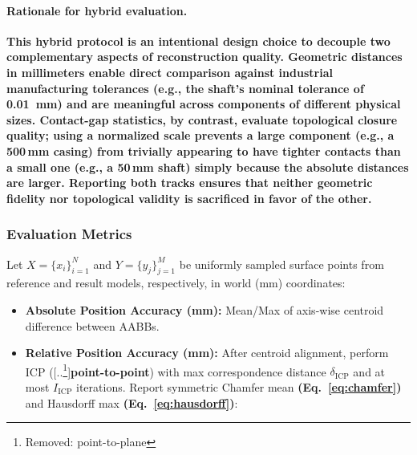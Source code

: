 \documentclass{ieeeaccess}
\providecommand{\DIFaddtex}[1]{{\color{blue}\bfseries #1}} %
\providecommand{\DIFdeltex}[1]{{\color{red}[..\footnote{\color{black}Removed: #1}]}} %
\providecommand{\DIFaddbegin}{} %
\providecommand{\DIFaddend}{} %
\providecommand{\DIFdelbegin}{} %
\providecommand{\DIFdelend}{} %
\providecommand{\DIFadd}[1]{\texorpdfstring{\DIFaddtex{#1}}{#1}} %
\providecommand{\DIFdel}[1]{\texorpdfstring{\DIFdeltex{#1}}{}} %
\begin{document}
\DIFaddbegin \paragraph*{\DIFadd{Rationale for hybrid evaluation.}}
\label{sec:hybrid_eval_rationale}
\DIFadd{This hybrid protocol is an intentional design choice to decouple
two complementary aspects of reconstruction quality.
Geometric distances in millimeters enable direct comparison
against industrial manufacturing tolerances (e.g., the shaft's
nominal tolerance of \SI{0.01}{\milli\meter}) and are meaningful
across components of different physical sizes.
Contact-gap statistics, by contrast, evaluate topological closure
quality; using a normalized scale prevents a large component
(e.g., a 500\,mm casing) from trivially appearing to have
tighter contacts than a small one (e.g., a 50\,mm shaft) simply
because the absolute distances are larger.
Reporting both tracks ensures that neither geometric fidelity
nor topological validity is sacrificed in favor of the other.
}

\DIFaddend \subsubsection{Evaluation Metrics}
Let \(X=\{x_i\}_{i=1}^{N}\) and \(Y=\{y_j\}_{j=1}^{M}\) be uniformly sampled surface points from reference and result models, respectively, in world (mm) coordinates:
\begin{itemize}
  \item \textbf{Absolute Position Accuracy (mm):} Mean/Max of axis-wise centroid difference between AABBs.
  \item \textbf{Relative Position Accuracy (mm):} After centroid alignment, perform ICP (\DIFdelbegin \DIFdel{point-to-plane}\DIFdelend \DIFaddbegin \DIFadd{point-to-point}\DIFaddend ) with max correspondence distance \(\delta_{\mathrm{ICP}}\) and at most \(I_{\mathrm{ICP}}\) iterations. Report symmetric Chamfer mean \DIFaddbegin \DIFadd{(Eq.~\eqref{eq:chamfer}) }\DIFaddend and Hausdorff max \DIFaddbegin \DIFadd{(Eq.~\eqref{eq:hausdorff})}\DIFaddend :
\end{itemize}
\end{document}
